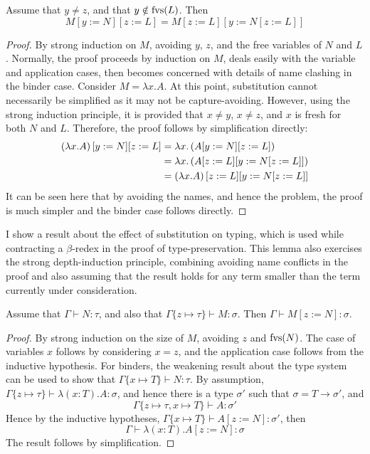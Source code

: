 \begin{lemma}
Assume that \(y \neq z\), and that \(y \notin \mathrm{fvs}(L)\).
Then
\[
M[y := N][z := L] = M[z := L][y := N[z := L]]
\]
\end{lemma}
\begin{proof}
By strong induction on \(M\), avoiding \(y\), \(z\), and the free variables of \(N\) and \(L\).
Normally, the proof proceeds by induction on \(M\), deals easily with the variable and application cases, then becomes concerned with details of name clashing in the binder case.
Consider \(M = \lambda x. A\).
At this point, substitution cannot necessarily be simplified as it may not be capture-avoiding.
However, using the strong induction principle, it is provided that \(x \neq y\), \(x \neq z\), and \(x\) is fresh for both \(N\) and \(L\).
Therefore, the proof follows by simplification directly:
\begin{align*}
\left(\lambda x. A\right)[y := N][z := L]
&= \lambda x. \left(A[y := N][z := L]\right)\\
&= \lambda x. \left(A[z := L][y := N[z := L]]\right)\\
&= \left(\lambda x. A\right)[z := L][y := N[z := L]]
\end{align*}
It can be seen here that by avoiding the names, and hence the problem, the proof is much simpler and the binder case follows directly.
\end{proof}

I show a result about the effect of substitution on typing, which is used while contracting a \(\beta\)-redex in the proof of type-preservation.
This lemma also exercises the strong depth-induction principle, combining avoiding name conflicts in the proof and also assuming that the result holds for any term smaller than the term currently under consideration.

\begin{lemma}
\label{lemma:typing-subst}
Assume that \(\Gamma \vdash N : \tau\), and also that \(\Gamma\{z \mapsto \tau\} \vdash M : \sigma\).
Then \(\Gamma \vdash M[z := N] : \sigma\).
\end{lemma}
\begin{proof}
By strong induction on the size of \(M\), avoiding \(z\) and \(\mathrm{fvs}(N)\).
The case of variables \(x\) follows by considering \(x = z\), and the application case follows from the inductive hypothesis.
For binders, the weakening result about the type system can be used to show that \(\Gamma\{x \mapsto T\} \vdash N : \tau\).
By assumption, \(\Gamma\{z \mapsto \tau\} \vdash \lambda (x:T).A : \sigma\), and hence there is a type \(\sigma'\) such that \(\sigma = T \to \sigma'\), and
\[
\Gamma\{z \mapsto \tau, x \mapsto T\} \vdash A : \sigma'
\]
Hence by the inductive hypotheses, \(\Gamma\{x \mapsto T\} \vdash A[z := N] : \sigma'\), then
\[
\Gamma \vdash \lambda (x:T). A[z := N] : \sigma
\]
The result follows by simplification.
\end{proof}

